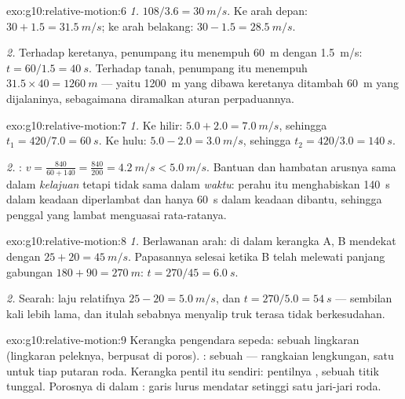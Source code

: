 \begin{solution}{exo:g10:relative-motion:6}
\emph{1.} $108/3.6 = \qty{30}{m/s}$. Ke arah depan:
$30 + 1.5 = \qty{31.5}{m/s}$; ke arah belakang:
$30 - 1.5 = \qty{28.5}{m/s}$.

\emph{2.} Terhadap keretanya, penumpang itu menempuh \qty{60}{m} dengan
\qty{1.5}{m/s}: $t = 60/1.5 = \qty{40}{s}$. Terhadap tanah, penumpang
itu menempuh $31.5 \times 40 = \qty{1260}{m}$ --- yaitu \qty{1200}{m}
yang dibawa keretanya ditambah \qty{60}{m} yang dijalaninya,
sebagaimana diramalkan aturan perpaduannya.
\end{solution}

\begin{solution}{exo:g10:relative-motion:7}
\emph{1.} Ke hilir: $5.0 + 2.0 = \qty{7.0}{m/s}$, sehingga
$t_1 = 420/7.0 = \qty{60}{s}$. Ke hulu: $5.0 - 2.0 = \qty{3.0}{m/s}$,
sehingga $t_2 = 420/3.0 = \qty{140}{s}$.

\emph{2.} : $v = \frac{840}{60 + 140}
= \frac{840}{200} = \qty{4.2}{m/s} < \qty{5.0}{m/s}$. Bantuan dan
hambatan arusnya sama dalam \emph{kelajuan} tetapi tidak sama dalam
\emph{waktu}: perahu itu menghabiskan \qty{140}{s} dalam keadaan
diperlambat dan hanya \qty{60}{s} dalam keadaan dibantu, sehingga
penggal yang lambat menguasai rata-ratanya.
\end{solution}

\begin{solution}{exo:g10:relative-motion:8}
\emph{1.} Berlawanan arah: di dalam kerangka A, B mendekat dengan
$25 + 20 = \qty{45}{m/s}$. Papasannya selesai ketika B telah melewati
panjang gabungan $180 + 90 = \qty{270}{m}$:
$t = 270/45 = \qty{6.0}{s}$.

\emph{2.} Searah: laju relatifnya $25 - 20 = \qty{5.0}{m/s}$, dan
$t = 270/5.0 = \qty{54}{s}$ --- sembilan kali lebih lama, dan itulah
sebabnya menyalip truk terasa tidak berkesudahan.
\end{solution}

\begin{solution}{exo:g10:relative-motion:9}
Kerangka pengendara sepeda: sebuah lingkaran (lingkaran peleknya,
berpusat di poros). : sebuah  --- rangkaian
lengkungan, satu untuk tiap putaran roda. Kerangka pentil itu sendiri:
pentilnya , sebuah titik tunggal. Porosnya di dalam :
garis lurus mendatar setinggi satu jari-jari roda.
\end{solution}

